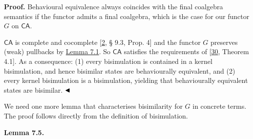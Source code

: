 \documentclass[11pt,a4paper]{amsart}
\begin{document}
\par\medskip
\hypertarget{html:S7.SS0.SSS0.P0.SPx3}{} \par\noindent\textbf{Proof.}\quad  %
\hypertarget{html:S7.SS0.SSS0.P0.SPx3.p1}{} Behavioural equivalence always coincides with the final coalgebra semantics if the functor admits a final coalgebra, which is the case for our functor %
\hypertarget{html:S7.SS0.SSS0.P0.SPx3.p1.m1}{}\({G}\) on %
\hypertarget{html:S7.SS0.SSS0.P0.SPx3.p1.m2}{}\({\mathsf{CA}}\).
\par\medskip
\hypertarget{html:S7.SS0.SSS0.P0.SPx3.p2}{} %
\hypertarget{html:S7.SS0.SSS0.P0.SPx3.p2.m1}{}\({\mathsf{CA}}\) is complete and cocomplete [\hyperlink{html:bib.bib2}{2}, § 9.3, Prop. 4] and the functor %
\hypertarget{html:S7.SS0.SSS0.P0.SPx3.p2.m2}{}\({G}\) preserves (weak) pullbacks by \hyperlink{html:S7.Thmtheorem1}{Lemma 7.1}. So %
\hypertarget{html:S7.SS0.SSS0.P0.SPx3.p2.m3}{}\({\mathsf{CA}}\) satisfies the requirements of [\hyperlink{html:bib.bib30}{30}, Theorem 4.1]. As a consequence: (1) every bisimulation is contained in a kernel bisimulation, and hence bisimilar states are behaviourally equivalent, and (2) every kernel bisimulation is a bisimulation, yielding that behaviourally equivalent states are bisimilar. %
\hypertarget{html:S7.SS0.SSS0.P0.SPx3.p2.m4}{}\({\hfill\blacktriangleleft}\)
\par\medskip
\hypertarget{html:S7.SS0.SSS0.P0.SPx3.p3}{} We need one more lemma that characterises bisimilarity for %
\hypertarget{html:S7.SS0.SSS0.P0.SPx3.p3.m1}{}\({G}\) in concrete terms. The proof follows directly from the definition of bisimulation.
\par\medskip
\hypertarget{html:S7.Thmtheorem5}{} \par\noindent\textbf{\textbf{Lemma 7.5}\textbf{.}}\quad  %
\end{document}
